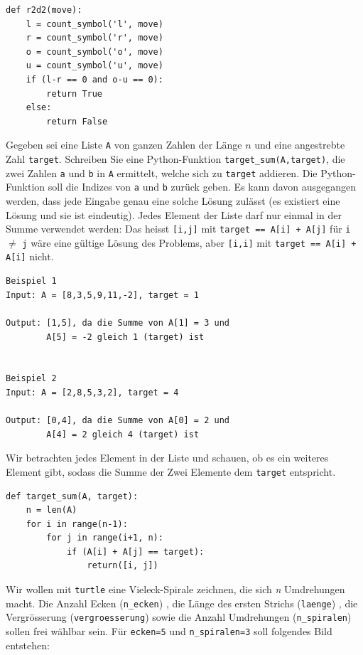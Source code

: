 \begin{questions}
\begin{solution}
\begin{lstlisting}
def r2d2(move):
    l = count_symbol('l', move)
    r = count_symbol('r', move)
    o = count_symbol('o', move)
    u = count_symbol('u', move)
    if (l-r == 0 and o-u == 0):
        return True
    else:
        return False
\end{lstlisting}
\end{solution}

\clearpage
{}

Gegeben sei eine Liste \lstinline|A| von ganzen Zahlen der Länge $n$ und eine angestrebte Zahl \mbox{\lstinline|target|.} Schreiben Sie eine Python-Funktion \lstinline|target_sum(A,target)|, die zwei Zahlen \lstinline|a| und \lstinline|b| in \lstinline|A| ermittelt, welche sich zu \lstinline|target| addieren. Die Python-Funktion soll die Indizes von \lstinline|a| und \lstinline|b| zurück geben. Es kann davon ausgegangen werden, dass jede Eingabe genau eine solche Lösung zulässt (es existiert eine Lösung und sie ist eindeutig). Jedes Element der Liste darf nur einmal in der Summe verwendet werden: Das heisst \lstinline|[i,j]| mit \lstinline|target == A[i] + A[j]| für \lstinline|i| $\neq$ \lstinline|j| wäre eine gültige Lösung des Problems, aber \lstinline|[i,i]| mit \lstinline|target == A[i] + A[i]| nicht.
\begin{lstlisting}[numbers=none,framexleftmargin=0em,xleftmargin=0em]
Beispiel 1
Input: A = [8,3,5,9,11,-2], target = 1

Output: [1,5], da die Summe von A[1] = 3 und
        A[5] = -2 gleich 1 (target) ist


Beispiel 2
Input: A = [2,8,5,3,2], target = 4

Output: [0,4], da die Summe von A[0] = 2 und
        A[4] = 2 gleich 4 (target) ist
\end{lstlisting}


\begin{solution}
Wir betrachten jedes Element in der Liste und schauen, ob es ein weiteres Element gibt, sodass die Summe der Zwei Elemente dem \lstinline|target| entspricht.
\begin{lstlisting}
def target_sum(A, target):
    n = len(A)
    for i in range(n-1):
        for j in range(i+1, n):
            if (A[i] + A[j] == target):
                return([i, j])
\end{lstlisting}
\end{solution}

\clearpage
{}
Wir wollen mit \lstinline|turtle| eine Vieleck-Spirale zeichnen, die sich \textit{n} Umdrehungen macht. Die Anzahl Ecken (\lstinline|n_ecken|) , die Länge des ersten Strichs (\lstinline|laenge|) , die Vergrösserung (\lstinline|vergroesserung|) sowie die Anzahl Umdrehungen (\lstinline|n_spiralen|) sollen frei wählbar sein. Für \lstinline|ecken=5| und \lstinline|n_spiralen=3| soll folgendes Bild entstehen:


\end{questions}

